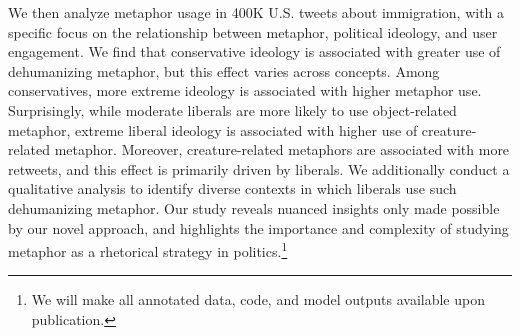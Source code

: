 We then analyze metaphor usage in 400K U.S. tweets about immigration, with a specific focus on the relationship between metaphor, political ideology, and user engagement. We find that conservative ideology is associated with greater use of dehumanizing metaphor, but this effect varies across concepts. Among conservatives, more extreme ideology is associated with higher metaphor use. Surprisingly, while moderate liberals are more likely to use object-related metaphor, extreme liberal ideology is associated with higher use of creature-related metaphor. Moreover, creature-related metaphors are associated with more retweets, and this effect is primarily driven by liberals. We additionally conduct a qualitative analysis to identify diverse contexts in which liberals use such dehumanizing metaphor. Our study reveals nuanced insights only made possible by our novel approach, and highlights the importance and complexity of studying metaphor as a rhetorical strategy in politics.\footnote{We will make all annotated data, code, and model outputs available upon publication.}





